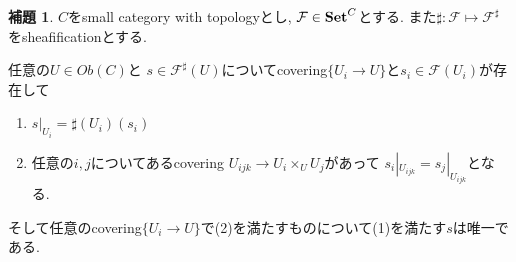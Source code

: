 \documentclass[dvipdfmx,a4paper,11pt]{article}
\theoremstyle{definition}
\newtheorem{lem}[thm]{補題}
\begin{document}
  \begin{tcolorbox}
 [colback = white, colframe = green!35!black, fonttitle = \bfseries,breakable = true]
 \begin{lem}\cite[00WK Lemma 10.15]{Sta}
 \label{lem-stacks-sheafification}
 $C$をsmall category with topologyとし, $\mathcal{F} \in {\bf Set}^{C}$とする.
 また$\sharp : \mathcal{F} \mapsto \mathcal{F}^{\sharp}$をsheafificationとする.
  
 任意の$U \in Ob(C)$と
  $s \in \mathcal{F}^{\sharp}(U)$についてcovering$\{ U_i \to U\}$と$s_i \in \mathcal{F}(U_i)$が存在して
  \begin{enumerate}
  \item $s|_{U_i} = \sharp(U_i)(s_i)$
  \item 任意の$i,j$についてあるcovering
  $U_{ijk} \to U_{i} \times_{U} U_j$があって
  $s_{i}|_{U_{ijk}} = s_{j}|_{U_{ijk}}$となる. 
  \end{enumerate}
そして任意のcovering$\{ U_i \to U\}$で(2)を満たすものについて(1)を満たす$s$は唯一である. 
 \end{lem}
 \end{tcolorbox}
\end{document}
